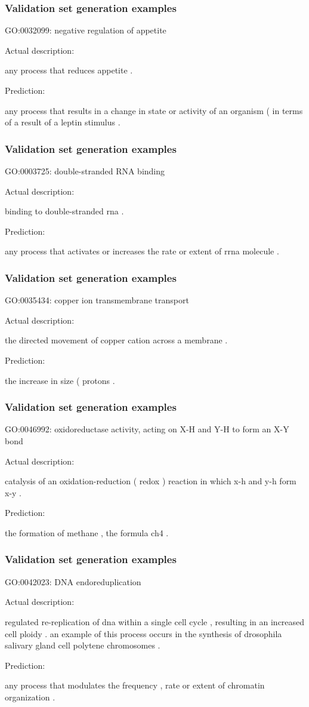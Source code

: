 \documentclass{beamer}
\begin{document}
\begin{frame}
\frametitle{Validation set generation examples}
GO:0032099: negative regulation of appetite

Actual description:

any process that reduces appetite .

Prediction:

any process that results in a change in state or activity of an organism ( in terms of a result of a leptin stimulus .
\end{frame}

\begin{frame}
\frametitle{Validation set generation examples}
GO:0003725: double-stranded RNA binding

Actual description:

binding to double-stranded rna .

Prediction:

any process that activates or increases the rate or extent of rrna molecule .
\end{frame}

\begin{frame}
\frametitle{Validation set generation examples}
GO:0035434: copper ion transmembrane transport

Actual description:

the directed movement of copper cation across a membrane .

Prediction:

the increase in size ( protons .
\end{frame}

\begin{frame}
\frametitle{Validation set generation examples}
GO:0046992: oxidoreductase activity, acting on X-H and Y-H to form an X-Y bond

Actual description:

catalysis of an oxidation-reduction ( redox ) reaction in which x-h and y-h form x-y .

Prediction:

the formation of methane , the formula ch4 .
\end{frame}

\begin{frame}
\frametitle{Validation set generation examples}
GO:0042023: DNA endoreduplication

Actual description:

regulated re-replication of dna within a single cell cycle , resulting in an increased cell ploidy . an example of this process occurs in the synthesis of drosophila salivary gland cell polytene chromosomes .

Prediction:

any process that modulates the frequency , rate or extent of chromatin organization .
\end{frame}
\end{document}
